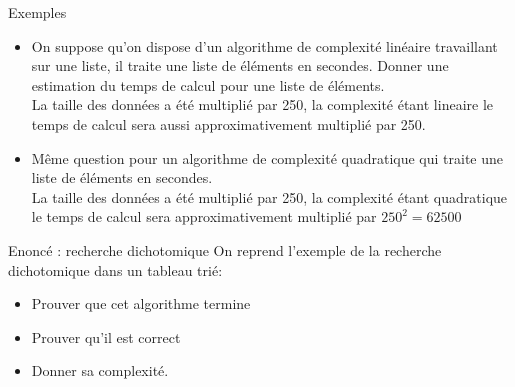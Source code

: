 \documentclass[10pt]{beamer}
\begin{document}
\begin{frame}[fragile]{\Ctitle}{\stitle}
	\begin{exampleblock}{Exemples}
		\begin{itemize}
			\item<1-> On suppose qu'on dispose d'un algorithme de complexité linéaire travaillant sur une liste, il traite une liste de  éléments en  secondes. Donner une estimation du temps de calcul pour une liste de  éléments.\\
				\onslide<2-> {\textcolor{OliveGreen}{La taille des données a été multiplié par 250, la complexité étant lineaire le temps de calcul sera aussi approximativement multiplié par 250. \\}}
				\onslide<3->{\textcolor{OliveGreen}{$0.015 \times 250 = 3.75$, on peut donc prévoir un temps de calcul d'environ 3,75 secondes}}
			\item<4-> Même question pour un algorithme de complexité quadratique qui traite une liste de  éléments en  secondes.\\
				\onslide<5-> {\textcolor{OliveGreen}{La taille des données a été multiplié par 250, la complexité étant quadratique le temps de calcul sera  approximativement multiplié par $250^2=62500$ \\}}
				\onslide<6->{\textcolor{OliveGreen}{$0.07 \times 62\,500 = 4375$, on peut donc prévoir un temps de calcul d'environ $4\,375$ secondes, c'est à dire près d'une heure et 15 minutes !}}
		\end{itemize}
	\end{exampleblock}
\end{frame}

\begin{frame}[fragile]{\Ctitle}{\stitle}
    \begin{exampleblock}{Enoncé : recherche dichotomique}
    On reprend l'exemple de la recherche dichotomique dans un tableau trié:
    \begin{itemize}
        \item<2-> Prouver que cet algorithme termine
        \item<3-> Prouver qu'il est correct
        \item<4-> Donner sa complexité.
    \end{itemize}
\end{exampleblock}
\end{frame}
\end{document}
